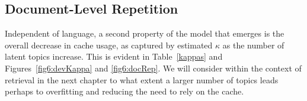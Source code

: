 % 

\subsection{Document-Level Repetition}

Independent of language, a second property of the model that emerges is the overall decrease in cache usage, as captured by estimated $\kappa$ as the number of latent topics increase.  This is evident in Table~\ref{kappas} and Figures~\ref{fig6:devKappa} and \ref{fig6:docRep}.  We will consider within the context of retrieval in the next chapter to what extent a larger number of topics leads perhaps to overfitting and reducing the need to rely on the cache.  


